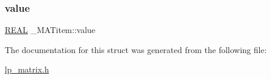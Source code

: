 \mbox{\label{struct___m_a_titem_aef0935a83fa966f9ab3e71b8a4bf2814}} 
\subsubsection{\texorpdfstring{value}{value}}
{\footnotesize\ttfamily \hyperlink{lp__lib_8h_a92bd5e363d131fa73669358edb232dce}{R\+E\+AL} \+\_\+\+M\+A\+Titem\+::value}



The documentation for this struct was generated from the following file\+:\begin{DoxyCompactItemize}
\item 
\hyperlink{lp__matrix_8h}{lp\+\_\+matrix.\+h}\end{DoxyCompactItemize}
